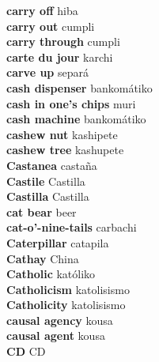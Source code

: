 \textbf{ carry off  } hiba \\
\textbf{ carry out  } cumpli \\
\textbf{ carry through  } cumpli \\
\textbf{ carte du jour  } karchi \\
\textbf{ carve up  } separá \\
\textbf{ cash dispenser  } bankomátiko \\
\textbf{ cash in one’s chips  } muri \\
\textbf{ cash machine  } bankomátiko \\
\textbf{ cashew nut  } kashipete \\
\textbf{ cashew tree  } kashupete \\
\textbf{ Castanea  } castaña \\
\textbf{ Castile  } Castilla \\
\textbf{ Castilla  } Castilla \\
\textbf{ cat bear  } beer \\
\textbf{ cat-o’-nine-tails  } carbachi \\
\textbf{ Caterpillar  } catapila \\
\textbf{ Cathay  } China \\
\textbf{ Catholic  } katóliko \\
\textbf{ Catholicism  } katolisismo \\
\textbf{ Catholicity  } katolisismo \\
\textbf{ causal agency  } kousa \\
\textbf{ causal agent  } kousa \\
\textbf{ CD  } CD \\
